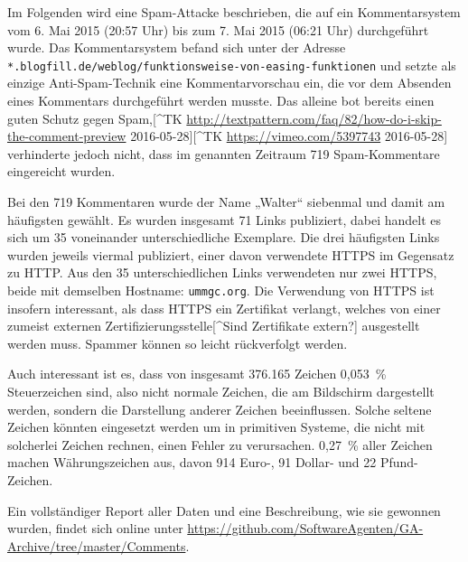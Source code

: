 Im Folgenden wird eine Spam-Attacke beschrieben, die auf ein
Kommentarsystem vom 6. Mai 2015 (20:57 Uhr) bis zum 7. Mai 2015 (06:21
Uhr) durchgeführt wurde. Das Kommentarsystem befand sich unter der
Adresse
\texttt{*.blogfill.de/weblog/funktionsweise-von-easing-funktionen} und
setzte als einzige Anti-Spam-Technik eine Kommentarvorschau ein, die vor
dem Absenden eines Kommentars durchgeführt werden musste. Das alleine
bot bereits einen guten Schutz gegen Spam,{[}\^{}TK
\url{http://textpattern.com/faq/82/how-do-i-skip-the-comment-preview}
2016-05-28{]}{[}\^{}TK \url{https://vimeo.com/5397743} 2016-05-28{]}
verhinderte jedoch nicht, dass im genannten Zeitraum 719 Spam-Kommentare
eingereicht wurden.

Bei den 719 Kommentaren wurde der Name „Walter“ siebenmal und damit am
häufigsten gewählt. Es wurden insgesamt 71 Links publiziert, dabei
handelt es sich um 35 voneinander unterschiedliche Exemplare. Die drei
häufigsten Links wurden jeweils viermal publiziert, einer davon
verwendete HTTPS im Gegensatz zu HTTP. Aus den 35 unterschiedlichen
Links verwendeten nur zwei HTTPS, beide mit demselben Hostname:
\texttt{ummgc.org}. Die Verwendung von HTTPS ist insofern interessant,
als dass HTTPS ein Zertifikat verlangt, welches von einer zumeist
externen Zertifizierungsstelle{[}\^{}Sind Zertifikate extern?{]}
ausgestellt werden muss. Spammer können so leicht rückverfolgt werden.

Auch interessant ist es, dass von insgesamt 376.165 Zeichen 0,053~\%
Steuerzeichen sind, also nicht normale Zeichen, die am Bildschirm
dargestellt werden, sondern die Darstellung anderer Zeichen
beeinflussen. Solche seltene Zeichen könnten eingesetzt werden um in
primitiven Systeme, die nicht mit solcherlei Zeichen rechnen, einen
Fehler zu verursachen. 0,27~\% aller Zeichen machen Währungszeichen aus,
davon 914 Euro-, 91 Dollar- und 22 Pfund-Zeichen.

Ein vollständiger Report aller Daten und eine Beschreibung, wie sie
gewonnen wurden, findet sich online unter
\url{https://github.com/SoftwareAgenten/GA-Archive/tree/master/Comments}.